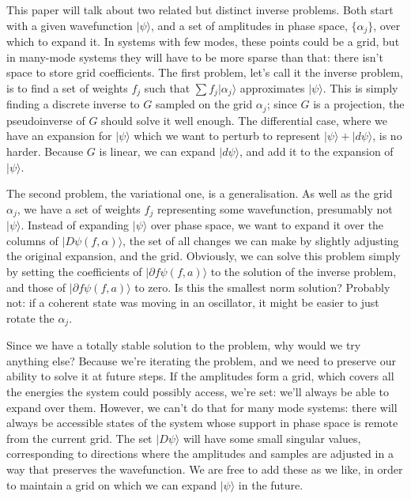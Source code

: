 This paper will talk about two related but distinct inverse problems.  Both start with a given wavefunction $|ψ\rangle$, and a set of amplitudes in phase space, $\{α_j\}$, over which to expand it.  In systems with few modes, these points could be a grid, but in many-mode systems they will have to be more sparse than that: there isn't space to store grid coefficients.  The first problem, let's call it the inverse problem, is to find a set of weights $f_j$ such that $∑f_j|α_j\rangle$ approximates $|ψ\rangle$.  This is simply finding a discrete inverse to $G$ sampled on the grid $α_j$; since $G$ is a projection, the pseudoinverse of $G$ should solve it well enough.  The differential case, where we have an expansion for $|ψ\rangle$ which we want to perturb to represent $|ψ\rangle+|dψ\rangle$, is no harder.  Because $G$ is linear, we can expand $|dψ\rangle$, and add it to the expansion of $|ψ\rangle$.

The second problem, the variational one, is a generalisation.  As well as the grid $α_j$, we have a set of weights $f_j$ representing some wavefunction, presumably not $|ψ\rangle$.  Instead of expanding $|ψ\rangle$ over phase space, we want to expand it over the columns of $|Dψ(f,α)\rangle$, the set of all changes we can make by slightly adjusting the original expansion, and the grid.  Obviously, we can solve this problem simply by setting the coefficients of $|∂fψ(f,a)\rangle$ to the solution of the inverse problem, and those of $|∂fψ(f,a)\rangle$ to zero.  Is this the smallest norm solution?  Probably not: if a coherent state was moving in an oscillator, it might be easier to just rotate the $α_j$.

Since we have a totally stable solution to the problem, why would we try anything else?  Because we're iterating the problem, and we need to preserve our ability to solve it at future steps.  If the amplitudes form a grid, which covers all the energies the system could possibly access, we're set: we'll always be able to expand over them.  However, we can't do that for many mode systems: there will always be accessible states of the system whose support in phase space is remote from the current grid.  The set $|Dψ\rangle$ will have some small singular values, corresponding to directions where the amplitudes and samples are adjusted in a way that preserves the wavefunction.  We are free to add these as we like, in order to maintain a grid on which we can expand $|ψ\rangle$ in the future.

